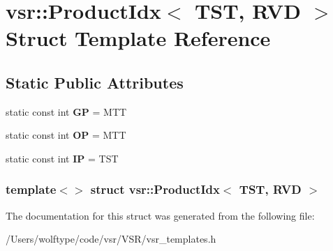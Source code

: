 \hypertarget{structvsr_1_1_product_idx_3_01_t_s_t_00_01_r_v_d_01_4}{\section{vsr\-:\-:Product\-Idx$<$ T\-S\-T, R\-V\-D $>$ Struct Template Reference}
\label{structvsr_1_1_product_idx_3_01_t_s_t_00_01_r_v_d_01_4}
}
\subsection*{Static Public Attributes}
\begin{DoxyCompactItemize}
\item 
\hypertarget{structvsr_1_1_product_idx_3_01_t_s_t_00_01_r_v_d_01_4_a486d88decc58dc1a0e253da5a81d3d72}{static const int {\bfseries G\-P} = M\-T\-T}\label{structvsr_1_1_product_idx_3_01_t_s_t_00_01_r_v_d_01_4_a486d88decc58dc1a0e253da5a81d3d72}

\item 
\hypertarget{structvsr_1_1_product_idx_3_01_t_s_t_00_01_r_v_d_01_4_a9542e981b042b566dd972eb05018b393}{static const int {\bfseries O\-P} = M\-T\-T}\label{structvsr_1_1_product_idx_3_01_t_s_t_00_01_r_v_d_01_4_a9542e981b042b566dd972eb05018b393}

\item 
\hypertarget{structvsr_1_1_product_idx_3_01_t_s_t_00_01_r_v_d_01_4_ae3c43e3b3bc0e673b838648d107e83c6}{static const int {\bfseries I\-P} = T\-S\-T}\label{structvsr_1_1_product_idx_3_01_t_s_t_00_01_r_v_d_01_4_ae3c43e3b3bc0e673b838648d107e83c6}

\end{DoxyCompactItemize}
\subsubsection*{template$<$$>$ struct vsr\-::\-Product\-Idx$<$ T\-S\-T, R\-V\-D $>$}



The documentation for this struct was generated from the following file\-:\begin{DoxyCompactItemize}
\item 
/\-Users/wolftype/code/vsr/\-V\-S\-R/vsr\-\_\-templates.\-h\end{DoxyCompactItemize}
